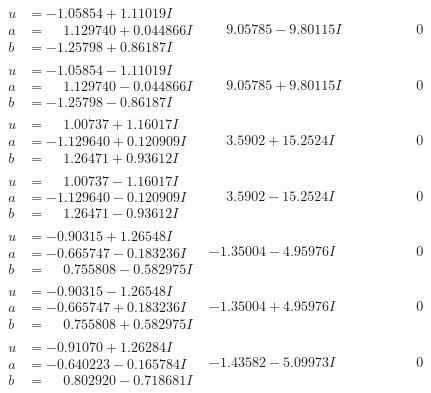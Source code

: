 \documentclass[1p]{elsarticle_modified}
\theoremstyle{definition}
\begin{document}
$$\begin{array}{c|c|c}
\begin{aligned}
u &= -1.05854 + 1.11019 I \\
a &= \phantom{-}1.129740 + 0.044866 I \\
b &= -1.25798 + 0.86187 I\end{aligned}
 & \phantom{-}9.05785 - 9.80115 I & \phantom{-0.000000 } 0 \\ \hline\begin{aligned}
u &= -1.05854 - 1.11019 I \\
a &= \phantom{-}1.129740 - 0.044866 I \\
b &= -1.25798 - 0.86187 I\end{aligned}
 & \phantom{-}9.05785 + 9.80115 I & \phantom{-0.000000 } 0 \\ \hline\begin{aligned}
u &= \phantom{-}1.00737 + 1.16017 I \\
a &= -1.129640 + 0.120909 I \\
b &= \phantom{-}1.26471 + 0.93612 I\end{aligned}
 & \phantom{-}3.5902 + 15.2524 I & \phantom{-0.000000 } 0 \\ \hline\begin{aligned}
u &= \phantom{-}1.00737 - 1.16017 I \\
a &= -1.129640 - 0.120909 I \\
b &= \phantom{-}1.26471 - 0.93612 I\end{aligned}
 & \phantom{-}3.5902 - 15.2524 I & \phantom{-0.000000 } 0 \\ \hline\begin{aligned}
u &= -0.90315 + 1.26548 I \\
a &= -0.665747 - 0.183236 I \\
b &= \phantom{-}0.755808 - 0.582975 I\end{aligned}
 & -1.35004 - 4.95976 I & \phantom{-0.000000 } 0 \\ \hline\begin{aligned}
u &= -0.90315 - 1.26548 I \\
a &= -0.665747 + 0.183236 I \\
b &= \phantom{-}0.755808 + 0.582975 I\end{aligned}
 & -1.35004 + 4.95976 I & \phantom{-0.000000 } 0 \\ \hline\begin{aligned}
u &= -0.91070 + 1.26284 I \\
a &= -0.640223 - 0.165784 I \\
b &= \phantom{-}0.802920 - 0.718681 I\end{aligned}
 & -1.43582 - 5.09973 I & \phantom{-0.000000 } 0\\

\end{array}$$
\end{document}
